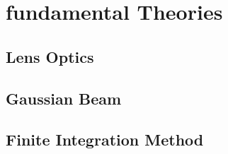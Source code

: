\chapter{fundamental Theories}

\section{Lens Optics}





\section{Gaussian Beam}



\section{Finite Integration Method}



